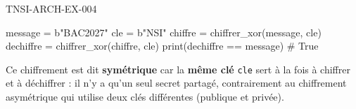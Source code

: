 \begin{corrige}{TNSI-ARCH-EX-004}
\begin{python}
message = b"BAC2027"
cle = b"NSI"
chiffre = chiffrer_xor(message, cle)
dechiffre = chiffrer_xor(chiffre, cle)
print(dechiffre == message)  # True
\end{python}
Ce chiffrement est dit \textbf{symétrique} car la \textbf{même clé} \texttt{cle} sert à la fois à chiffrer et à déchiffrer : il n'y a qu'un seul secret partagé, contrairement au chiffrement asymétrique qui utilise deux clés différentes (publique et privée).
\end{corrige}
